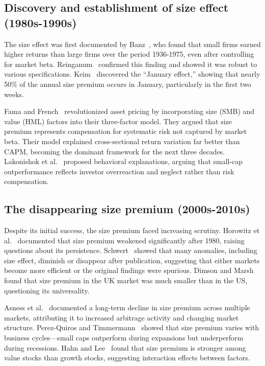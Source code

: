\documentclass[10pt,letterpaper]{article}
\begin{document}
\subsection*{Discovery and establishment of size effect (1980s-1990s)}

The size effect was first documented by Banz~\cite{banz1981}, who found that small firms earned higher returns than large firms over the period 1936-1975, even after controlling for market beta. Reinganum~\cite{reinganum1981} confirmed this finding and showed it was robust to various specifications. Keim~\cite{keim1983} discovered the ``January effect,'' showing that nearly 50\% of the annual size premium occurs in January, particularly in the first two weeks.

Fama and French~\cite{fama1992,fama1993} revolutionized asset pricing by incorporating size (SMB) and value (HML) factors into their three-factor model. They argued that size premium represents compensation for systematic risk not captured by market beta. Their model explained cross-sectional return variation far better than CAPM, becoming the dominant framework for the next three decades. Lakonishok et al.~\cite{lakonishok1994} proposed behavioral explanations, arguing that small-cap outperformance reflects investor overreaction and neglect rather than risk compensation.

\subsection*{The disappearing size premium (2000s-2010s)}

Despite its initial success, the size premium faced increasing scrutiny. Horowitz et al.~\cite{horowitz2000} documented that size premium weakened significantly after 1980, raising questions about its persistence. Schwert~\cite{schwert2003} showed that many anomalies, including size effect, diminish or disappear after publication, suggesting that either markets become more efficient or the original findings were spurious. Dimson and Marsh~\cite{dimson1999} found that size premium in the UK market was much smaller than in the US, questioning its universality.

Asness et al.~\cite{asness2018} documented a long-term decline in size premium across multiple markets, attributing it to increased arbitrage activity and changing market structure. Perez-Quiros and Timmermann~\cite{perez2000} showed that size premium varies with business cycles---small caps outperform during expansions but underperform during recessions. Hahn and Lee~\cite{hahn2006} found that size premium is stronger among value stocks than growth stocks, suggesting interaction effects between factors.
\end{document}
